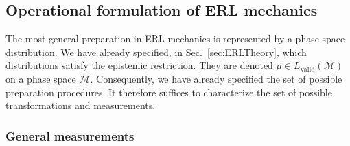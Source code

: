 \documentclass[pra,superscriptaddress,nofootinbib,12pt]{revtex4-2}
\begin{document}
\subsection{Operational formulation of ERL mechanics}
\label{sec:Characterisation}

The most general preparation in ERL mechanics is represented by a phase-space distribution.  We have already specified, in Sec.~\ref{sec:ERLTheory}, which distributions satisfy the epistemic restriction.  They are denoted $\mu \in L_{\text{valid}}(\mathcal{M})$ on a phase space $\mathcal{M}$.  Consequently, we have already specified the set of possible preparation procedures.  It therefore suffices to characterize the set of possible transformations and measurements.


\subsubsection{General measurements}
\label{sec:indicatorfns}
\end{document}
